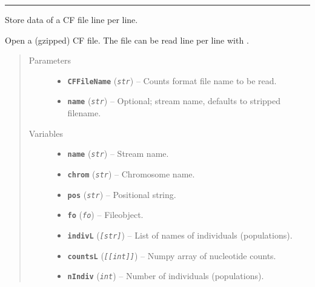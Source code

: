 \documentclass[letterpaper,10pt,english]{sphinxmanual}
\begin{document}
\bigskip\hrule{}\bigskip


\begin{fulllineitems}
\label{cf:libPoMo.cf.CFStream}
Store data of a CF file line per line.

Open a (gzipped) CF file. The file can be read line per line with
{\hyperref[cf:libPoMo.cf.CFStream.read_next_pos]{}}.
\begin{quote}\begin{description}
\item[{Parameters}] \leavevmode\begin{itemize}
\item {} 
\textbf{\texttt{CFFileName}} (\emph{\texttt{str}}) -- Counts format file name to be read.

\item {} 
\textbf{\texttt{name}} (\emph{\texttt{str}}) -- Optional; stream name, defaults to stripped
filename.

\end{itemize}

\item[{Variables}] \leavevmode\begin{itemize}
\item {} 
\textbf{\texttt{name}} (\emph{\texttt{str}}) -- Stream name.

\item {} 
\textbf{\texttt{chrom}} (\emph{\texttt{str}}) -- Chromosome name.

\item {} 
\textbf{\texttt{pos}} (\emph{\texttt{str}}) -- Positional string.

\item {} 
\textbf{\texttt{fo}} (\emph{\texttt{fo}}) -- Fileobject.

\item {} 
\textbf{\texttt{indivL}} (\emph{\texttt{{[}str{]}}}) -- List of names of individuals (populations).

\item {} 
\textbf{\texttt{countsL}} (\emph{\texttt{{[}{[}int{]}{]}}}) -- Numpy array of nucleotide counts.

\item {} 
\textbf{\texttt{nIndiv}} (\emph{\texttt{int}}) -- Number of individuals (populations).


\end{itemize}
\end{description}
\end{quote}
\end{fulllineitems}
\end{document}
